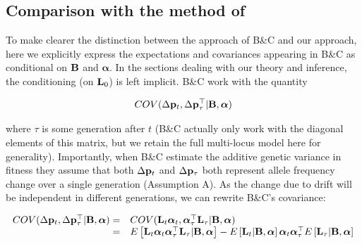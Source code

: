 \documentclass[12pt]{article}
\begin{document}
\begin{bibunit}
\section{Comparison with the method of \citet{buffalo2019linked}}
\label{App:BandC}

To make clearer the distinction between the approach of B\&C and our approach, here we explicitly express the expectations and covariances appearing in B\&C as conditional on ${\bf B}$ and $\boldsymbol{\alpha}$. In the sections dealing with our theory and inference, the conditioning (on ${\bf L}_0$) is left implicit. B\&C work with the quantity

\begin{equation}
COV(\Delta {\bf p}_t, \Delta {\bf p}_{\tau}^{\top} | {\bf B}, \boldsymbol{\alpha})
\end{equation}

where $\tau$ is some generation after $t$ (B\&C actually only work with the diagonal elements of this matrix, but we retain the full multi-locus model here for generality). Importantly, when B\&C estimate the additive genetic variance in fitness they assume that both $\Delta {\bf p}_t$ and $\Delta {\bf p}_{\tau}$ both represent allele frequency change over a single generation (Assumption A). As the change due to drift will be independent in different generations, we can rewrite B\&C's covariance: 

\begin{equation}
\begin{array}{rl}
COV(\Delta {\bf p}_t, \Delta {\bf p}_{\tau}^\top  | {\bf B}, \boldsymbol{\alpha}) 
=& COV({\bf L}_t\boldsymbol{\alpha}_t,  \boldsymbol{\alpha}_{\tau}^{\top}{\bf L}_{\tau}  | {\bf B}, \boldsymbol{\alpha})\\
=& E\left[{\bf L}_t\boldsymbol{\alpha}_t\boldsymbol{\alpha}_{\tau}^{\top}{\bf L}_{\tau} | {\bf B}, \boldsymbol{\alpha}\right]-E\left[{\bf L}_t | {\bf B}, \boldsymbol{\alpha}\right]\boldsymbol{\alpha}_t \boldsymbol{\alpha}_{\tau}^{\top}E\left[{\bf L}_{\tau} | {\bf B}, \boldsymbol{\alpha}\right]\\
\end{array}
\label{Eq:BCcov1}
\end{equation}


\end{bibunit}
\end{document}
